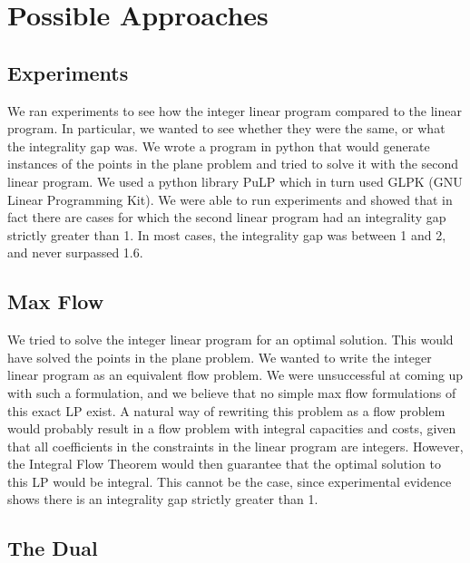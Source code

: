 \documentclass[11pt]{article}
\begin{document}
\section{Possible Approaches}

\subsection{Experiments}

We ran experiments to see how the integer linear program compared to the linear program. In particular, we wanted to see whether they were the same, or what the integrality gap was. We wrote a program in python that would generate instances of the points in the plane problem and tried to solve it with the second linear program. We used a python library PuLP which in turn used GLPK (GNU Linear Programming Kit). We were able to run experiments and showed that in fact there are cases for which the second linear program had an integrality gap strictly greater than 1. In most cases, the integrality gap was between 1 and 2, and never surpassed 1.6.

\subsection{Max Flow}

We tried to solve the integer linear program for an optimal solution. This would have solved the points in the plane problem. We wanted to write the integer linear program as an equivalent flow problem. We were unsuccessful at coming up with such a formulation, and we believe that no simple max flow formulations of this exact LP exist. A natural way of rewriting this problem as a flow problem would probably result in a flow problem with integral capacities and costs, given that all coefficients in the constraints in the linear program are integers. However, the Integral Flow Theorem would then guarantee that the optimal solution to this LP would be integral. This cannot be the case, since experimental evidence shows there is an integrality gap strictly greater than 1.

\subsection{The Dual}
\end{document}
